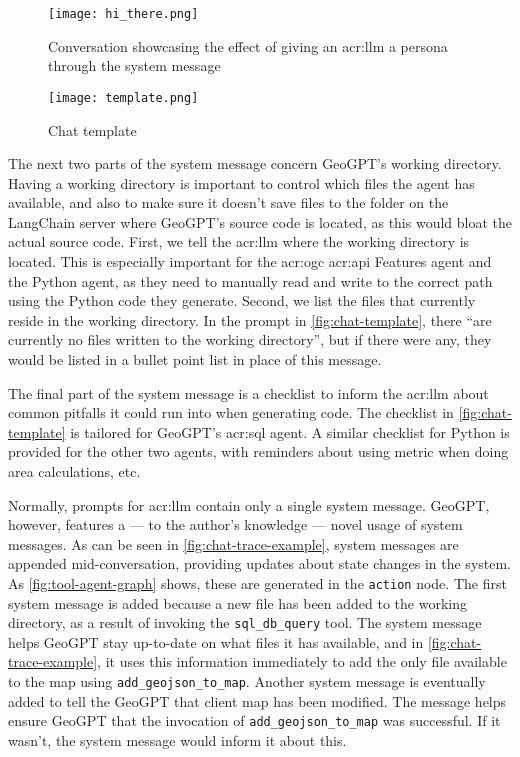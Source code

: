 \begin{figure}[H]
    \centering
    \texttt{[image: hi\_there.png]}
    \caption{Conversation showcasing the effect of giving an \acrshort{acr:llm} a persona through the system message}
    \label{fig:effect-of-system-message}
\end{figure}

\begin{figure}
    \centering
    \texttt{[image: template.png]}
    \caption{Chat template}
    \label{fig:chat-template}
\end{figure}

The next two parts of the system message concern GeoGPT's working directory. Having a working directory is important to control which files the agent has available, and also to make sure it doesn't save files to the folder on the LangChain server where GeoGPT's source code is located, as this would bloat the actual source code. First, we tell the \acrshort{acr:llm} where the working directory is located. This is especially important for the \acrshort{acr:ogc} \acrshort{acr:api} Features agent and the Python agent, as they need to manually read and write to the correct path using the Python code they generate. Second, we list the files that currently reside in the working directory. In the prompt in \autoref{fig:chat-template}, there \enquote{are currently no files written to the working directory}, but if there were any, they would be listed in a bullet point list in place of this message.

The final part of the system message is a checklist to inform the \acrshort{acr:llm} about common pitfalls it could run into when generating code. The checklist in \autoref{fig:chat-template} is tailored for GeoGPT's \acrshort{acr:sql} agent. A similar checklist for Python is provided for the other two agents, with reminders about using metric  when doing area calculations, etc.

Normally, prompts for \acrshort{acr:llm} contain only a single system message. GeoGPT, however, features a --- to the author's knowledge --- novel usage of system messages. As can be seen in \autoref{fig:chat-trace-example}, system messages are appended mid-conversation, providing updates about state changes in the system. As \autoref{fig:tool-agent-graph} shows, these are generated in the \texttt{action} node. The first system message is added because a new file has been added to the working directory, as a result of invoking the \texttt{sql\_db\_query} tool. The system message helps GeoGPT stay up-to-date on what files it has available, and in \autoref{fig:chat-trace-example}, it uses this information immediately to add the only file available to the map using \texttt{add\_geojson\_to\_map}. Another system message is eventually added to tell the GeoGPT that client map has been modified. The message helps ensure GeoGPT that the invocation of \texttt{add\_geojson\_to\_map} was successful. If it wasn't, the system message would inform it about this.

\glsresetall


